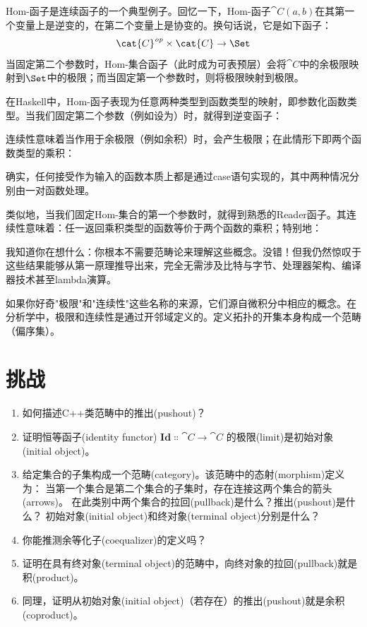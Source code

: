 Hom-函子是连续函子的一个典型例子。回忆一下，Hom-函子$\cat{C}(a, b)$在其第一个变量上是逆变的，在第二个变量上是协变的。换句话说，它是如下函子：
\[\cat{C}^\mathit{op} \times \cat{C} \to \Set\]
当固定第二个参数时，Hom-集合函子（此时成为可表预层）会将$\cat{C}$中的余极限映射到$\Set$中的极限；而当固定第一个参数时，则将极限映射到极限。

在Haskell中，Hom-函子表现为任意两种类型到函数类型的映射，即参数化函数类型。当我们固定第二个参数（例如设为）时，就得到逆变函子：

连续性意味着当作用于余极限（例如余积）时，会产生极限；在此情形下即两个函数类型的乘积：

确实，任何接受作为输入的函数本质上都是通过case语句实现的，其中两种情况分别由一对函数处理。

类似地，当我们固定Hom-集合的第一个参数时，就得到熟悉的Reader函子。其连续性意味着：任一返回乘积类型的函数等价于两个函数的乘积；特别地：

我知道你在想什么：你根本不需要范畴论来理解这些概念。没错！但我仍然惊叹于这些结果能够从第一原理推导出来，完全无需涉及比特与字节、处理器架构、编译器技术甚至lambda演算。

如果你好奇"极限"和"连续性"这些名称的来源，它们源自微积分中相应的概念。在分析学中，极限和连续性是通过开邻域定义的。定义拓扑的开集本身构成一个范畴（偏序集）。

\section{挑战}

\begin{enumerate}
  \tightlist
  \item
        如何描述C++类范畴中的推出(pushout)？
  \item
        证明恒等函子(identity functor)
        $\mathbf{Id} \Colon \cat{C} \to \cat{C}$ 的极限(limit)是初始对象(initial object)。
  \item
        给定集合的子集构成一个范畴(category)。该范畴中的态射(morphism)定义为：
        当第一个集合是第二个集合的子集时，存在连接这两个集合的箭头(arrows)。
        在此类别中两个集合的拉回(pullback)是什么？推出(pushout)是什么？
        初始对象(initial object)和终对象(terminal object)分别是什么？
  \item
        你能推测余等化子(coequalizer)的定义吗？
  \item
        证明在具有终对象(terminal object)的范畴中，向终对象的拉回(pullback)就是积(product)。
  \item
        同理，证明从初始对象(initial object)（若存在）的推出(pushout)就是余积(coproduct)。
\end{enumerate}